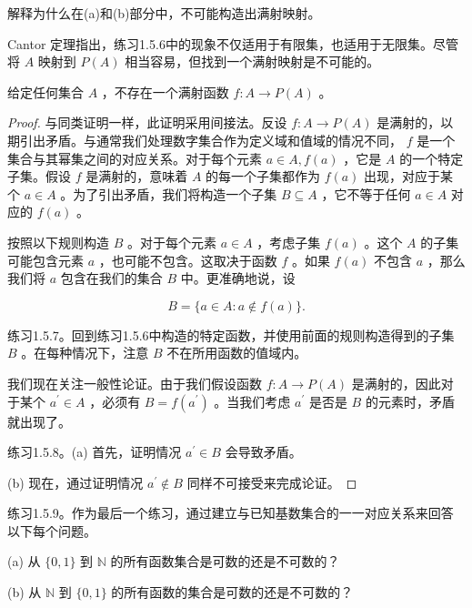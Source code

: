 解释为什么在(a)和(b)部分中，不可能构造出满射映射。

Cantor 定理指出，练习1.5.6中的现象不仅适用于有限集，也适用于无限集。尽管将 \(A\) 映射到 \(P\left( A\right)\) 相当容易，但找到一个满射映射是不可能的。

\begin{Thm}[Cantor]
  \label{thm:1.5.2}
  给定任何集合 \(A\) ，不存在一个满射函数 \(f : A \rightarrow  P\left( A\right)\) 。
\end{Thm}

\begin{proof}
与同类证明一样，此证明采用间接法。反设 \(f : A \rightarrow  P\left( A\right)\) 是满射的，以期引出矛盾。与通常我们处理数字集合作为定义域和值域的情况不同， \(f\) 是一个集合与其幂集之间的对应关系。对于每个元素 \(a \in  A,f\left( a\right)\) ，它是 \(A\) 的一个特定子集。假设 \(f\) 是满射的，意味着 \(A\) 的每一个子集都作为 \(f\left( a\right)\) 出现，对应于某个 \(a \in  A\) 。为了引出矛盾，我们将构造一个子集 \(B \subseteq  A\) ，它不等于任何 \(a \in  A\) 对应的 \(f\left( a\right)\) 。

按照以下规则构造 \(B\) 。对于每个元素 \(a \in  A\) ，考虑子集 \(f\left( a\right)\) 。这个 \(A\) 的子集可能包含元素 \(a\) ，也可能不包含。这取决于函数 \(f\) 。如果 \(f\left( a\right)\) 不包含 \(a\) ，那么我们将 \(a\) 包含在我们的集合 \(B\) 中。更准确地说，设

\[
B = \{ a \in  A : a \notin  f\left( a\right) \} .
\]

练习1.5.7。回到练习1.5.6中构造的特定函数，并使用前面的规则构造得到的子集 \(B\) 。在每种情况下，注意 \(B\) 不在所用函数的值域内。

我们现在关注一般性论证。由于我们假设函数 \(f : A \rightarrow  P\left( A\right)\) 是满射的，因此对于某个 \({a}^{\prime } \in  A\) ，必须有 \(B = f\left( {a}^{\prime }\right)\) 。当我们考虑 \({a}^{\prime }\) 是否是 \(B\) 的元素时，矛盾就出现了。

练习1.5.8。(a) 首先，证明情况 \({a}^{\prime } \in  B\) 会导致矛盾。

(b) 现在，通过证明情况 \({a}^{\prime } \notin  B\) 同样不可接受来完成论证。  
\end{proof}

练习1.5.9。作为最后一个练习，通过建立与已知基数集合的一一对应关系来回答以下每个问题。

(a) 从 \(\{ 0,1\}\) 到 \(\mathbb{N}\) 的所有函数集合是可数的还是不可数的？

(b) 从 \(\mathbb{N}\) 到 \(\{ 0,1\}\) 的所有函数的集合是可数的还是不可数的？

